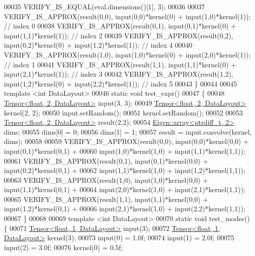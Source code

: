 \begin{DoxyCode}
00035   VERIFY\_IS\_EQUAL(eval.dimensions()[1], 3);
00036 
00037   VERIFY\_IS\_APPROX(result(0,0), input(0,0)*kernel(0) + input(1,0)*kernel(1));  \textcolor{comment}{// index 0}
00038   VERIFY\_IS\_APPROX(result(0,1), input(0,1)*kernel(0) + input(1,1)*kernel(1));  \textcolor{comment}{// index 2}
00039   VERIFY\_IS\_APPROX(result(0,2), input(0,2)*kernel(0) + input(1,2)*kernel(1));  \textcolor{comment}{// index 4}
00040   VERIFY\_IS\_APPROX(result(1,0), input(1,0)*kernel(0) + input(2,0)*kernel(1));  \textcolor{comment}{// index 1}
00041   VERIFY\_IS\_APPROX(result(1,1), input(1,1)*kernel(0) + input(2,1)*kernel(1));  \textcolor{comment}{// index 3}
00042   VERIFY\_IS\_APPROX(result(1,2), input(1,2)*kernel(0) + input(2,2)*kernel(1));  \textcolor{comment}{// index 5}
00043 \}
00044 
00045 \textcolor{keyword}{template} <\textcolor{keywordtype}{int} DataLayout>
00046 \textcolor{keyword}{static} \textcolor{keywordtype}{void} test\_expr()
00047 \{
00048   \hyperlink{class_eigen_1_1_tensor}{Tensor<float, 2, DataLayout>} input(3, 3);
00049   \hyperlink{class_eigen_1_1_tensor}{Tensor<float, 2, DataLayout>} kernel(2, 2);
00050   input.setRandom();
00051   kernel.setRandom();
00052 
00053   \hyperlink{class_eigen_1_1_tensor}{Tensor<float, 2, DataLayout>} result(2,2);
00054   \hyperlink{class_eigen_1_1array}{Eigen::array<ptrdiff\_t, 2>} dims;
00055   dims[0] = 0;
00056   dims[1] = 1;
00057   result = input.convolve(kernel, dims);
00058 
00059   VERIFY\_IS\_APPROX(result(0,0), input(0,0)*kernel(0,0) + input(0,1)*kernel(0,1) +
00060                                 input(1,0)*kernel(1,0) + input(1,1)*kernel(1,1));
00061   VERIFY\_IS\_APPROX(result(0,1), input(0,1)*kernel(0,0) + input(0,2)*kernel(0,1) +
00062                                 input(1,1)*kernel(1,0) + input(1,2)*kernel(1,1));
00063   VERIFY\_IS\_APPROX(result(1,0), input(1,0)*kernel(0,0) + input(1,1)*kernel(0,1) +
00064                                 input(2,0)*kernel(1,0) + input(2,1)*kernel(1,1));
00065   VERIFY\_IS\_APPROX(result(1,1), input(1,1)*kernel(0,0) + input(1,2)*kernel(0,1) +
00066                                 input(2,1)*kernel(1,0) + input(2,2)*kernel(1,1));
00067 \}
00068 
00069 \textcolor{keyword}{template} <\textcolor{keywordtype}{int} DataLayout>
00070 \textcolor{keyword}{static} \textcolor{keywordtype}{void} test\_modes() \{
00071   \hyperlink{class_eigen_1_1_tensor}{Tensor<float, 1, DataLayout>} input(3);
00072   \hyperlink{class_eigen_1_1_tensor}{Tensor<float, 1, DataLayout>} kernel(3);
00073   input(0) = 1.0f;
00074   input(1) = 2.0f;
00075   input(2) = 3.0f;
00076   kernel(0) = 0.5f;

\end{DoxyCode}
